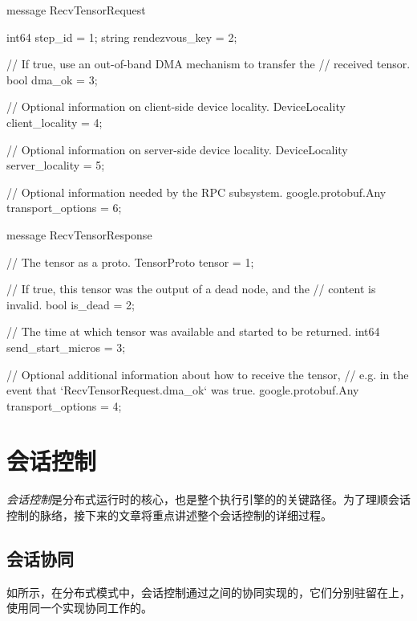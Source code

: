 \begin{content}
\begin{content}
\begin{content}
\begin{leftbar}
\begin{c++}
message RecvTensorRequest {
  int64 step_id = 1;
  string rendezvous_key = 2;

  // If true, use an out-of-band DMA mechanism to transfer the
  // received tensor.
  bool dma_ok = 3;

  // Optional information on client-side device locality.
  DeviceLocality client_locality = 4;

  // Optional information on server-side device locality.
  DeviceLocality server_locality = 5;

  // Optional information needed by the RPC subsystem.
  google.protobuf.Any transport_options = 6;
}

message RecvTensorResponse {
  // The tensor as a proto.
  TensorProto tensor = 1;

  // If true, this tensor was the output of a dead node, and the
  // content is invalid.
  bool is_dead = 2;

  // The time at which tensor was available and started to be returned.
  int64 send_start_micros = 3;

  // Optional additional information about how to receive the tensor,
  // e.g. in the event that `RecvTensorRequest.dma\_ok` was true.
  google.protobuf.Any transport_options = 4;
}
\end{c++}
\end{leftbar}

\end{content}

\section{会话控制}

\emph{会话控制}是\tf{}分布式运行时的核心，也是整个\tf{}执行引擎的的关键路径。为了理顺会话控制的脉络，接下来的文章将重点讲述整个会话控制的详细过程。

\begin{content}

\subsection{会话协同}

如所示，在分布式模式中，会话控制通过之间的协同实现的，它们分别驻留在上，使用同一个实现协同工作的。


\end{content}
\end{content}
\end{content}
